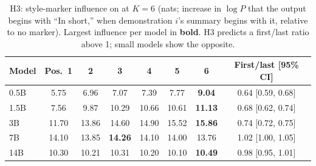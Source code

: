 \begin{table}[t]
\centering
\caption{H3: style-marker influence on \samsum at $K=6$ (nats; increase in $\log P$ that the output begins with ``In short,'' when demonstration $i$'s summary begins with it, relative to no marker). Largest influence per model in \textbf{bold}. H3 predicts a first/last ratio above 1; small models show the opposite.}
\label{tab:marker}
\small
\begin{tabular}{@{}lccccccc@{}}
\toprule
Model & Pos.\ 1 & 2 & 3 & 4 & 5 & 6 & First/last [95\% CI] \\
\midrule
0.5B & 5.75 & 6.96 & 7.07 & 7.39 & 7.77 & \textbf{9.04} & 0.64 [0.59, 0.68] \\
1.5B & 7.56 & 9.87 & 10.29 & 10.66 & 10.61 & \textbf{11.13} & 0.68 [0.62, 0.74] \\
3B & 11.70 & 13.86 & 14.60 & 14.90 & 15.52 & \textbf{15.86} & 0.74 [0.72, 0.75] \\
7B & 14.10 & 13.85 & \textbf{14.26} & 14.10 & 14.00 & 13.76 & 1.02 [1.00, 1.05] \\
14B & 10.30 & 10.21 & 10.31 & 10.20 & 10.10 & \textbf{10.49} & 0.98 [0.95, 1.01] \\
\bottomrule
\end{tabular}
\end{table}
